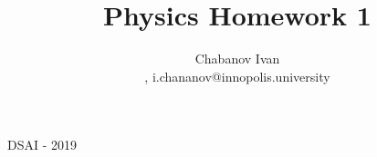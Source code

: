 

\begin{titlepage}
    \title{Physics Homework 1}
    \author{Chabanov Ivan\\, i.chananov@innopolis.university}
    \maketitle
    DSAI - 2019


\end{titlepage}
